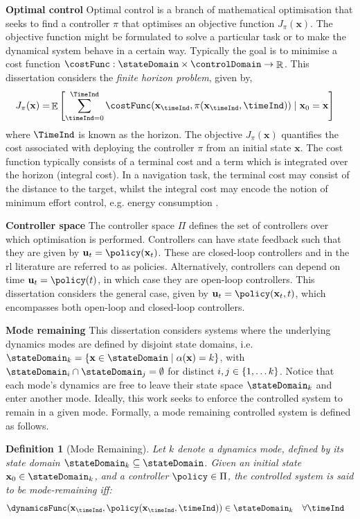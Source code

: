 \documentclass{mimosis-class/mimosis}
\newtheorem{definition}{Definition}[section]
\numberwithin{equation}{chapter}
\DeclareMathOperator{\R}{\mathbb{R}}
\DeclareMathOperator{\E}{\mathbb{E}}
\newcommand{\modeInd}{\ensuremath{k}}
\newcommand{\ModeInd}{\ensuremath{\MakeUppercase{\modeInd}}}
\newcommand{\mode}[1]{\ensuremath{#1_{\modeInd}}}
\newcommand{\state}{\ensuremath{\mathbf{x}}}
\newcommand{\control}{\ensuremath{\mathbf{u}}}
\newcommand{\x}{\ensuremath{\mathbf{x}}}
\newcommand{\modeVar}{\ensuremath{\alpha}}
\begin{document}
\textbf{Optimal control}
Optimal control is a branch of mathematical optimisation that seeks to find a controller \(\pi\) that
optimises an objective function \(J_{\pi}(\x)\).
The objective function might be formulated to solve a particular task or to make the dynamical
system behave in a certain way.
Typically the goal is to minimise a cost function \(\costFunc : \stateDomain \times \controlDomain \rightarrow \R\).
This dissertation considers the \emph{finite horizon problem}, given by,
\begin{align} \label{eq-optimal-control-objective}
J_{\pi}(\state) = &\E \left[ \sum_{\timeInd=0}^{\TimeInd} \costFunc(\state_{\timeInd}, \pi(\state_{\timeInd}, \timeInd))
\mid \state_0=\state \right]
\end{align}
where \(\TimeInd\) is known as the horizon.
The objective \(J_{\pi}(\state)\) quantifies the cost associated with deploying the controller \(\pi\) from
an initial state \(\state\).
The cost function typically consists of a terminal cost and a term which is integrated over the horizon (integral cost).
In a navigation task, the terminal cost may consist of the distance to the target, whilst the integral cost
may encode the notion of minimum effort control, e.g. energy consumption \citep{kirkOptimal2004}.

\textbf{Controller space}
The controller space \(\Pi\) defines the set of controllers over which optimisation is performed.
Controllers can have state feedback such that they are given by \(\control_t = \policy(\state_t)\).
These are closed-loop controllers and  in the \acrshort{rl} literature are referred to as policies.
Alternatively, controllers can depend on time \(\control_t = \policy(t)\), in which case they are open-loop controllers.
This dissertation considers the general case, given by \(\control_t = \policy(\state_t, t)\),
which encompasses both open-loop and closed-loop controllers.

\textbf{Mode remaining}
This dissertation considers systems where the underlying dynamics modes are defined by disjoint state domains, i.e.
\(\mode{\stateDomain} = \{ \state \in \stateDomain \mid \modeVar(\state) = \modeInd \}\), with
\(\stateDomain_{i} \cap \stateDomain_{j} = \emptyset\) for distinct \(i, j \in \{1, \ldots \ModeInd\}\).
Notice that each mode's dynamics are free to leave their state space \(\mode{\stateDomain}\)
and enter another mode.
Ideally, this work seeks to enforce the controlled system to remain in a given mode.
Formally, a mode remaining controlled system is defined as follows.
\begin{definition}[Mode Remaining] \label{def-mode-remaining-main}
Let $\modeInd$ denote a dynamics mode, defined by its state domain $\mode{\stateDomain} \subseteq \stateDomain$.
Given an initial state $\state_0 \in \mode{\stateDomain}$, and a controller $\policy \in \Pi$,
the controlled system is said to be mode-remaining iff:
\begin{align} \label{eq-mode-remaining-def-main}
\dynamicsFunc(\state_{\timeInd}, \policy(\state_{\timeInd}, \timeInd))
&\in \mode{\stateDomain} \quad \forall \timeInd
\end{align}
\end{definition}
\end{document}
